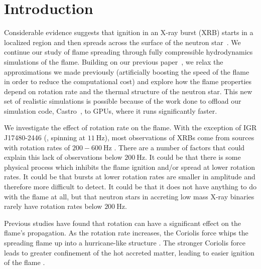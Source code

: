 \documentclass[preprint,times,tighten]{aastex63}
\newcommand{\castro}{{\sf Castro}}
\begin{document}

\section{Introduction}\label{Sec:Introduction}

Considerable evidence suggests that ignition in an X-ray burst (XRB) starts
in a localized region and then spreads across the surface of the
neutron star~\citep{bhattacharyya:2007,chakraborty:2014}.  We continue
our study of flame spreading through fully compressible hydrodynamics
simulations of the flame.  Building on our previous
paper~\citep{flame_wave1}, we relax the approximations we made
previously (artificially boosting the speed of the flame in order to
reduce the computational cost) and explore how the flame properties
depend on rotation rate and the thermal structure of the neutron
star. This new set of realistic simulations is possible because of the
work done to offload our simulation code, \castro~\citep{castro_joss}, to GPUs, where it
runs significantly faster.


We investigate the effect of rotation rate on the flame. With the
exception of IGR J17480-2446 (\citealt{altamirano2010discovery}, spinning at $11~\mathrm{Hz}$), most observations of
XRBs come from sources with rotation rates of $200-600~\mathrm{Hz}$
\citep{bilous:2019,galloway:2020}. There are a number of
factors that could explain this lack of observations below $200~\mathrm{Hz}$. It
could be that there is some physical process which inhibits the flame
ignition and/or spread at lower rotation rates. It could be that bursts
at lower rotation rates are smaller in amplitude and
therefore more difficult to detect. It could be that it does not have
anything to do with the flame at all, but that neutron stars in
accreting low mass X-ray binaries rarely have rotation rates below $200~\mathrm{Hz}$.
 
Previous studies have found that rotation can have a significant
effect on the flame's propagation. As the rotation rate increases, the
Coriolis force whips the spreading flame up into a hurricane-like
structure \citep{spitkovsky2002,cavecchi:2013}. The stronger Coriolis
force leads to greater confinement of the hot accreted matter, leading
to easier ignition of the flame \citep{art-2015-cavecchi-etal}.
\end{document}

